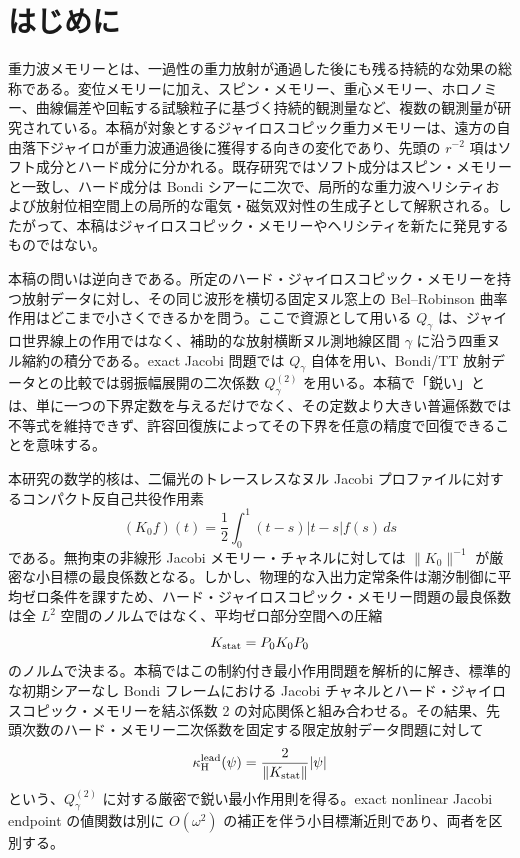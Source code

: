 \section{はじめに}
重力波メモリーとは、一過性の重力放射が通過した後にも残る持続的な効果の総称である。変位メモリーに加え、スピン・メモリー、重心メモリー、ホロノミー、曲線偏差や回転する試験粒子に基づく持続的観測量など、複数の観測量が研究されている\cite{Flanagan2019,Flanagan2020,GrantNichols2022,SerajNeogi2023,Harte2025}。本稿が対象とするジャイロスコピック重力メモリーは、遠方の自由落下ジャイロが重力波通過後に獲得する向きの変化であり、先頭の $r^{-2}$ 項はソフト成分とハード成分に分かれる。既存研究ではソフト成分はスピン・メモリーと一致し、ハード成分は Bondi シアーに二次で、局所的な重力波ヘリシティおよび放射位相空間上の局所的な電気・磁気双対性の生成子として解釈される\cite{SerajOblak2023,FayeSeraj2025}。したがって、本稿はジャイロスコピック・メモリーやヘリシティを新たに発見するものではない。

本稿の問いは逆向きである。所定のハード・ジャイロスコピック・メモリーを持つ放射データに対し、その同じ波形を横切る固定ヌル窓上の Bel--Robinson 曲率作用はどこまで小さくできるかを問う。ここで資源として用いる $Q_\gamma$ は、ジャイロ世界線上の作用ではなく、補助的な放射横断ヌル測地線区間 $\gamma$ に沿う四重ヌル縮約の積分である。exact Jacobi 問題では $Q_\gamma$ 自体を用い、Bondi/TT 放射データとの比較では弱振幅展開の二次係数 $Q_\gamma^{(2)}$ を用いる。本稿で「鋭い」とは、単に一つの下界定数を与えるだけでなく、その定数より大きい普遍係数では不等式を維持できず、許容回復族によってその下界を任意の精度で回復できることを意味する。

本研究の数学的核は、二偏光のトレースレスなヌル Jacobi プロファイルに対するコンパクト反自己共役作用素
\[
(K_0f)(t)=\frac12\int_0^1(t-s)|t-s|f(s)\,ds
\]
である。無拘束の非線形 Jacobi メモリー・チャネルに対しては $\|K_0\|^{-1}$ が厳密な小目標の最良係数となる。しかし、物理的な入出力定常条件は潮汐制御に平均ゼロ条件を課すため、ハード・ジャイロスコピック・メモリー問題の最良係数は全 $L^2$ 空間のノルムではなく、平均ゼロ部分空間への圧縮
\[
K_{\rm stat}=P_0K_0P_0
\]
のノルムで決まる。本稿ではこの制約付き最小作用問題を解析的に解き、標準的な初期シアーなし Bondi フレームにおける Jacobi チャネルとハード・ジャイロスコピック・メモリーを結ぶ係数 2 の対応関係と組み合わせる。その結果、先頭次数のハード・メモリー二次係数を固定する限定放射データ問題に対して
\[
\kappa_{\rm H}^{\rm lead}(\psi)=\frac{2}{\|K_{\rm stat}\|}|\psi|
\]
という、$Q_\gamma^{(2)}$ に対する厳密で鋭い最小作用則を得る。exact nonlinear Jacobi endpoint の値関数は別に \(O(\omega^2)\) の補正を伴う小目標漸近則であり、両者を区別する。

